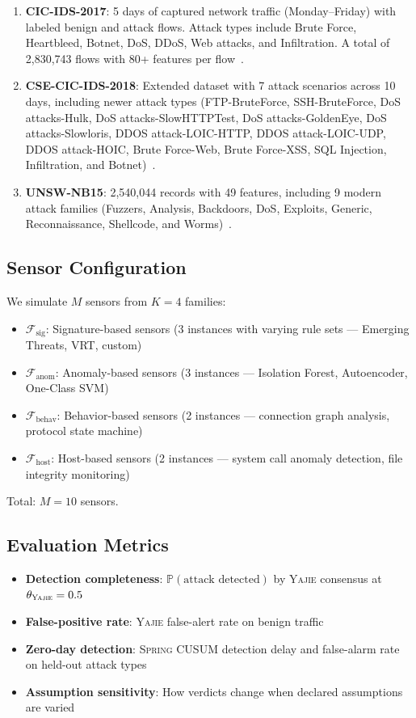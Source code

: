 \documentclass[11pt,a4paper]{article}
\theoremstyle{definition}
\theoremstyle{remark}
\newcommand{\Yajie}{\textsc{Yajie}}
\newcommand{\Spring}{\textsc{Spring}}
\newcommand{\Pbb}{\mathbb{P}}
\newcommand{\cF}{\mathcal{F}}
\begin{document}
\begin{enumerate}[label=(\roman*)]
    \item \textbf{CIC-IDS-2017}: 5 days of captured network traffic (Monday--Friday) with labeled benign and attack flows. Attack types include Brute Force, Heartbleed, Botnet, DoS, DDoS, Web attacks, and Infiltration. A total of 2,830,743 flows with 80+ features per flow~\cite{Sharafaldin2018}.
    \item \textbf{CSE-CIC-IDS-2018}: Extended dataset with 7 attack scenarios across 10 days, including newer attack types (FTP-BruteForce, SSH-BruteForce, DoS attacks-Hulk, DoS attacks-SlowHTTPTest, DoS attacks-GoldenEye, DoS attacks-Slowloris, DDOS attack-LOIC-HTTP, DDOS attack-LOIC-UDP, DDOS attack-HOIC, Brute Force-Web, Brute Force-XSS, SQL Injection, Infiltration, and Botnet)~\cite{CSE-CIC-IDS2018}.
    \item \textbf{UNSW-NB15}: 2,540,044 records with 49 features, including 9 modern attack families (Fuzzers, Analysis, Backdoors, DoS, Exploits, Generic, Reconnaissance, Shellcode, and Worms)~\cite{Moustafa2015}.
\end{enumerate}

\subsection{Sensor Configuration }

We simulate $M$ sensors from $K = 4$ families:
\begin{itemize}[nosep]
    \item $\cF_{\mathrm{sig}}$: Signature-based sensors (3 instances with varying rule sets — Emerging Threats, VRT, custom)
    \item $\cF_{\mathrm{anom}}$: Anomaly-based sensors (3 instances — Isolation Forest, Autoencoder, One-Class SVM)
    \item $\cF_{\mathrm{behav}}$: Behavior-based sensors (2 instances — connection graph analysis, protocol state machine)
    \item $\cF_{\mathrm{host}}$: Host-based sensors (2 instances — system call anomaly detection, file integrity monitoring)
\end{itemize}
Total: $M = 10$ sensors.

\subsection{Evaluation Metrics }

\begin{itemize}[nosep]
    \item \textbf{Detection completeness}: $\Pbb(\text{attack detected})$ by \Yajie{} consensus at $\theta_{\Yajie} = 0.5$
    \item \textbf{False-positive rate}: \Yajie{} false-alert rate on benign traffic
    \item \textbf{Zero-day detection}: \Spring{} CUSUM detection delay and false-alarm rate on held-out attack types
    \item \textbf{Assumption sensitivity}: How verdicts change when declared assumptions are varied
\end{itemize}
\end{document}
